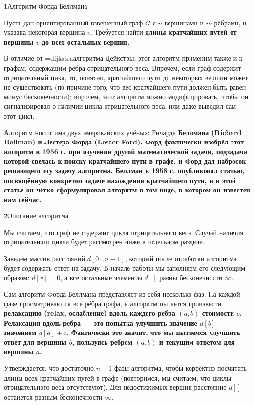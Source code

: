 \h1{Алгоритм Форда-Беллмана}

Пусть дан ориентированный взвешенный граф $G$ с $n$ вершинами и $m$ рёбрами, и указана некоторая вершина $v$. Требуется найти \bf{длины кратчайших путей} от вершины $v$ до всех остальных вершин.

В отличие от \algohref=dijkstra{алгоритма Дейкстры}, этот алгоритм применим также и к графам, содержащим рёбра отрицательного веса. Впрочем, если граф содержит отрицательный цикл, то, понятно, кратчайшего пути до некоторых вершин может не существовать (по причине того, что вес кратчайшего пути должен быть равен минус бесконечности); впрочем, этот алгоритм можно модифицировать, чтобы он сигнализировал о наличии цикла отрицательного веса, или даже выводил сам этот цикл.

Алгоритм носит имя двух американских учёных: Ричарда \bf{Беллмана} (Richard Bellman) и Лестера \bf{Форда} (Lester Ford). Форд фактически изобрёл этот алгоритм в 1956 г. при изучении другой математической задачи, подзадача которой свелась к поиску кратчайшего пути в графе, и Форд дал набросок решающего эту задачу алгоритма. Беллман в 1958 г. опубликовал статью, посвящённую конкретно задаче нахождения кратчайшего пути, и в этой статье он чётко сформулировал алгоритм в том виде, в котором он известен нам сейчас.


\h2{Описание алгоритма}

Мы считаем, что граф не содержит цикла отрицательного веса. Случай наличия отрицательного цикла будет рассмотрен ниже в отдельном разделе.

Заведём массив расстояний $d[0 \ldots n-1]$, который после отработки алгоритма будет содержать ответ на задачу. В начале работы мы заполняем его следующим образом: $d[v] = 0$, а все остальные элементы $d[]$ равны бесконечности $\infty$.

Сам алгоритм Форда-Беллмана представляет из себя несколько фаз. На каждой фазе просматриваются все рёбра графа, и алгоритм пытается произвести \bf{релаксацию} (relax, ослабление) вдоль каждого ребра $(a,b)$ стоимости $c$. Релаксация вдоль ребра --- это попытка улучшить значение $d[b]$ значением $d[a] + c$. Фактически это значит, что мы пытаемся улучшить ответ для вершины $b$, пользуясь ребром $(a,b)$ и текущим ответом для вершины $a$.

Утверждается, что достаточно $n-1$ фазы алгоритма, чтобы корректно посчитать длины всех кратчайших путей в графе (повторимся, мы считаем, что циклы отрицательного веса отсутствуют). Для недостижимых вершин расстояние $d[]$ останется равным бесконечности $\infty$.



